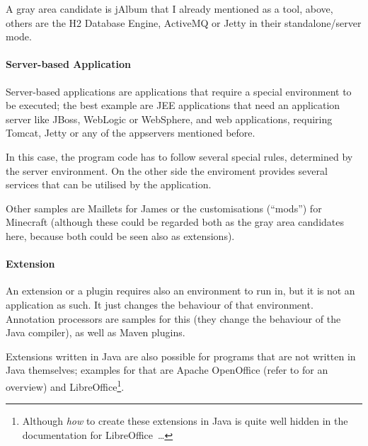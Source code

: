 \documentclass[11pt,a4paper, titlepage, parskip=half, headsepline, footsepline, cleardoublepage=current, headheight=1cm]{scrbook}
\begin{document}
A gray area candidate is jAlbum that I already mentioned as a tool, above, others are 
the H2 Database Engine, ActiveMQ or Jetty in their standalone/server mode.


\paragraph{Server-based Application}\label{sec:ServerbasedApplication}
Server-based applications are applications that require a special environment to be executed; the best example are JEE applications that need an application server like JBoss\autocite{REDHAT_JBOSS}, WebLogic\autocite{ORACLE_WEBLOGIC} or WebSphere\autocite{IBM_WEBSPHERE}, and web applications, requiring Tomcat\autocite{APACHE_TOMCAT}, Jetty\autocite{ECLIPSE_JETTY} or any of the appservers mentioned before.

In this case, the program code has to follow several special rules, determined by the server environment. On the other side the enviroment provides several services that can be utilised by the application.

Other samples are Maillets for James\autocite{APACHE_JAMES} or the customisations (“mods”) for Minecraft\autocite{MINECRAFT} (although these could be regarded both as the gray area candidates here, because both could be seen also as extensions).


\paragraph{Extension}\label{sec:Extension}
An extension or a plugin requires also an environment to run in, but it is not an application as such. It just changes the behaviour of that environment. Annotation processors are samples for this (they change the behaviour of the Java compiler), as well as Maven\autocite{APACHE_MAVEN} plugins.

Extensions written in Java are also possible for programs that are not written in Java themselves; examples for that are Apache OpenOffice\autocite{APACHE_OPENOFFICE} (refer to \autocite{APACHE_OPENOFFICE:ExtensionsInJava} for an overview) and LibreOffice\autocite{LIBREOFFICE}\footnote{Although \textit{how} to create these extensions in Java is quite well hidden in the documentation for LibreOffice~…}.
\end{document}
